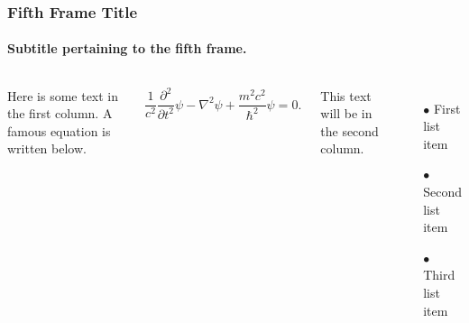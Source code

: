 \documentclass[aspectratio=169]{beamer}
\numberwithin{equation}{section}
\begin{document}
\begin{frame}
\frametitle{Fifth Frame Title}
\framesubtitle{Subtitle pertaining to the fifth frame.}

\begin{columns}

Here is some text in the first column. A famous equation is written below.

\begin{equation*}
    \frac{1}{c^2} \frac{\partial^2}{\partial t^2} \psi - \nabla^2 \psi + \frac{m^2 c^2}{\hbar^2} \psi = 0.
\end{equation*}

This text will be in the second column.

\begin{itemize}
    \item[$\bullet$] First list item
    \item[$\bullet$] Second list item
    \item[$\bullet$] Third list item
\end{itemize}

\end{columns}

\end{frame}
\end{document}
